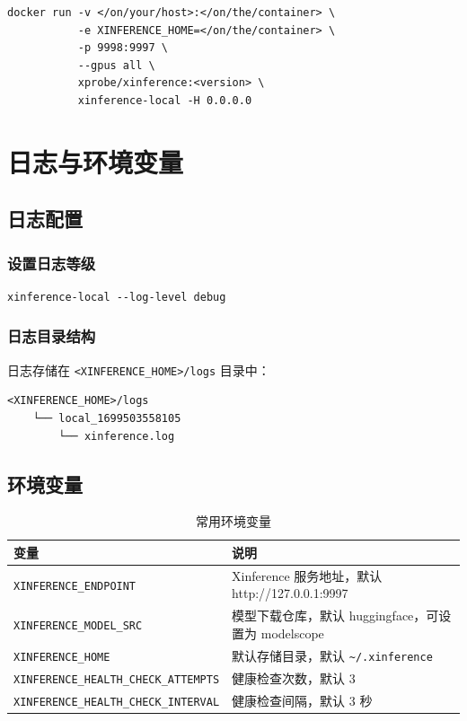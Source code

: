 \documentclass[12pt,UTF8]{ctexbook}
\begin{document}
\begin{lstlisting}
docker run -v </on/your/host>:</on/the/container> \
           -e XINFERENCE_HOME=</on/the/container> \
           -p 9998:9997 \
           --gpus all \
           xprobe/xinference:<version> \
           xinference-local -H 0.0.0.0
\end{lstlisting}

\chapter{日志与环境变量}
\label{chap:logging_env}

\section{日志配置}
\label{sec:logging_config}

\subsection{设置日志等级}

\begin{lstlisting}
xinference-local --log-level debug
\end{lstlisting}

\subsection{日志目录结构}

日志存储在 \texttt{<XINFERENCE\_HOME>/logs} 目录中：

\begin{lstlisting}
<XINFERENCE_HOME>/logs
    └── local_1699503558105
        └── xinference.log
\end{lstlisting}

\section{环境变量}
\label{sec:environment_variables}

\begin{table}[htbp]
    \centering
    \caption{常用环境变量}
    \footnotesize
    \begin{tabular}{|p{6cm}|p{5cm}|}
        \hline
        \textbf{变量} & \textbf{说明} \\
        \hline
        \texttt{XINFERENCE\_ENDPOINT} & Xinference 服务地址，默认 http://127.0.0.1:9997 \\
        \hline
        \texttt{XINFERENCE\_MODEL\_SRC} & 模型下载仓库，默认 huggingface，可设置为 modelscope \\
        \hline
        \texttt{XINFERENCE\_HOME} & 默认存储目录，默认 \texttt{\textasciitilde/.xinference} \\
        \hline
        \texttt{XINFERENCE\_HEALTH\_CHECK\_ATTEMPTS} & 健康检查次数，默认 3 \\
        \hline
        \texttt{XINFERENCE\_HEALTH\_CHECK\_INTERVAL} & 健康检查间隔，默认 3 秒 \\
        \hline
    \end{tabular}
\end{table}
\end{document}
